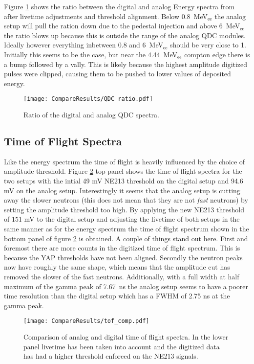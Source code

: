 \documentclass[main.tex]{subfiles}
\begin{document}
Figure \ref{fig:qdc_ratio} shows the ratio between the digital and analog Energy spectra from after livetime adjustments and threshold alignment. Below \SI{0.8}{\MeV}$_\text{ee}$ the analog setup will pull the ration down due to the pedestal injection and above \SI{6}{\MeV}$_\text{ee}$ the ratio blows up because this is outside the range of the analog QDC modules. Ideally however everything inbetween 0.8 and \SI{6}{\MeV}$_\text{ee}$ should be very close to 1. Initially this seems to be the case, but near the \SI{4.44}{\MeV}$_\text{ee}$ compton edge there is a bump followed by a vally. This is likely because the highest amplitude digitized pulses were clipped, causing them to be pushed to lower values of deposited energy.
\begin{figure}[h]
    \centering
        \texttt{[image: CompareResults/QDC\_ratio.pdf]}
        \caption{Ratio of the digital and analog QDC spectra.}
    \label{fig:qdc_ratio}
\end{figure}

\subsection{Time of Flight Spectra}
Like the energy spectrum the time of flight is heavily influenced by the choice of amplitude threshold. Figure \ref{fig:tof_comp} top panel shows the time of flight spectra for the two setups with the intial 49 mV NE213 threshold on the digital setup and 94.6 mV on the analog setup. Interestingly it seems that the analog setup is cutting away the slower neutrons (this does not mean that they are not \textit{fast} neutrons) by setting the amplitude threshold too high. By applying the new NE213 threshold of 151 mV to the digital setup and adjusting the livetime of both setups in the same manner as for the energy spectrum the time of flight spectrum shown in the bottom panel of figure \ref{fig:tof_comp} is obtained. A couple of things stand out here. First and foremost there are more counts in the digitized time of flight spectrum. This is because the YAP thresholds have not been aligned. Secondly the neutron peaks now have roughly the same shape, which means that the amplitude cut has removed the slower of the fast neutrons. Additionally, with a full width at half maximum of the gamma peak of \SI{7.67}{\ns} the analog setup seems to have a poorer time resolution than the digital setup which has a FWHM of 2.75 ns at the gamma peak.

\begin{figure}[h]
    \centering
        \texttt{[image: CompareResults/tof\_comp.pdf]}
        \caption{Comparison of analog and digital time of flight spectra. In the lower panel livetime has been taken into account and the digitized data has had a higher threshold enforced on the NE213 signals.}
    \label{fig:tof_comp}
\end{figure}
\end{document}

